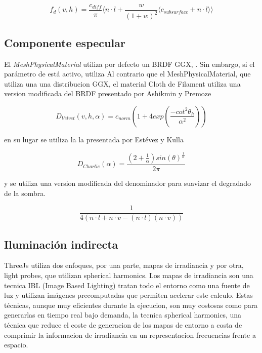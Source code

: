   \begin{equation}
  f_d(v, h) = \frac{c_{diff}}{\pi}
  \Bigg\langle
  n\cdot{l} + \frac{w}{(1+ w)^2}\langle c_{subsurface} + n \cdot{l} \rangle
  \Bigg\rangle
  \end{equation}
  \singlespacing

  \subsection{Componente especular}

  El \textit{MeshPhysicalMaterial} utiliza por defecto un BRDF GGX, \autocite{ggx}. Sin embargo, si el par\'ametro de 
  est\'a activo, utiliza 
  Al contrario que el MeshPhysicalMaterial, que utiliza una una distribucion GGX, el material
  Cloth de Filament utiliza una  version modificada del BRDF presentado por Ashikmin y Premoze
  \autocite{velvet}

  \begin{equation}
  D_{Velvet}(v, h, \alpha) = c_{norm} (
    1 + 4exp \left(\frac{-cot^2\theta_h}{\alpha^2}\right)
  )
  \end{equation}
  \singlespacing

  \hspace{-1.5em}en su lugar se utiliza la la presentada por Est\'evez y Kulla \autocite{sheen}

  \begin{equation}
    D_{Charlie}(\alpha) = \frac
      {(2 + \frac{1}{\alpha})sin(\theta)^\frac{1}{\alpha}}
      {2\pi}
  \end{equation}
  \singlespacing

  \hspace{-1.5em}y se utiliza una version modificada del denominador para suavizar el degradado de la sombra.

  \begin{equation}
  \frac{1}{4(n\cdot{l} + n\cdot{v} - (n\cdot{l})(n\cdot{v}) )}
  \end{equation}
  \singlespacing

  \subsection{Iluminaci\'on indirecta}
    ThreeJs utiliza dos enfoques, por una parte, mapas de irradiancia y por otra, light probes, que
    utilizan spherical harmonics. Los mapas de irradiancia son una tecnica IBL (Image Based Lighting)
    tratan todo el entorno como una fuente de luz y utilizan im\'agenes precomputadas que permiten
    acelerar este calculo. Estas t\'ecnicas, aunque muy eficientes durante la ejecucion, son muy
    costosas como para generarlas en tiempo real bajo demanda, la tecnica spherical harmonics, una
    t\'ecnica que reduce el coste de generacion de los mapas de entorno a costa de comprimir la
    informacion de irradiancia en un representacion frecuencias frente a espacio.

